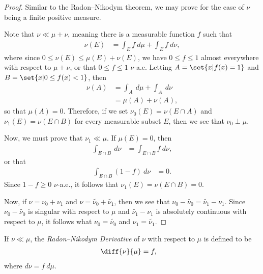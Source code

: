 \documentclass[10pt]{mypackage}
\begin{document}
\begin{proof}
  Similar to the Radon--Nikodym theorem, we may prove for the case of $\nu$ being a finite positive measure.\newline

  Note that $\nu\ll\mu+ \nu$, meaning there is a measurable function $f$ such that
  \begin{align*}
    \nu\left( E \right) &= \int_{E}^{} f\:d\mu + \int_{E}^{} f\:d\nu,
  \end{align*}
  where since $0\leq \nu\left( E \right) \leq \mu\left( E \right) + \nu\left( E \right)$, we have $0\leq f \leq 1$ almost everywhere with respect to $\mu + \nu$, or that $0\leq f \leq 1$ $\nu$-a.e. Letting $A = \set{x | f(x) = 1}$ and $B = \set{x | 0\leq f(x) < 1}$, then
  \begin{align*}
    \nu\left( A \right) &= \int_{A}^{} \:d\mu + \int_{A}^{} \:d\nu\\
                        &= \mu\left( A \right) + \nu\left( A \right),
  \end{align*}
  so that $\mu\left( A \right) = 0$. Therefore, if we set $\nu_0\left( E \right) = \nu\left( E\cap A \right)$ and $\nu_1\left( E \right) = \nu\left( E\cap B \right)$ for every measurable subset $E$, then we see that $\nu_0\perp \mu$.\newline

  Now, we must prove that $\nu_1\ll\mu$. If $\mu\left( E \right) = 0$, then
  \begin{align*}
    \int_{E\cap B}^{} \:d\nu &= \int_{E\cap B}^{} f\:d\nu,
  \end{align*}
  or that
  \begin{align*}
    \int_{E\cap B}^{} \left( 1-f \right)\:d\nu &= 0.
  \end{align*}
  Since $1-f \geq 0$ $\nu$-a.e., it follows that $\nu_1\left( E \right) = \nu\left( E\cap B \right) = 0$.\newline

  Now, if $\nu = \nu_0 + \nu_1$ and $\nu = \widetilde{\nu_0} + \widetilde{\nu_1}$, then we see that $\nu_0- \widetilde{\nu_0} = \widetilde{\nu_1} - \nu_1$. Since $\nu_0 - \widetilde{\nu_0}$ is singular with respect to $\mu$ and $ \widetilde{\nu_1} - \nu_1 $ is absolutely continuous with respect to $\mu$, it follows what $\nu_0 = \widetilde{\nu_0}$ and $\nu_1 = \widetilde{\nu_1}$.
\end{proof}
\begin{definition}
  If $\nu\ll\mu$, the \textit{Radon--Nikodym Derivative} of $\nu$ with respect to $\mu$ is defined to be
  \begin{align*}
    \diff{\nu}{\mu} &= f,
  \end{align*}
  where $d\nu = f\:d\mu$.
\end{definition}
\end{document}
